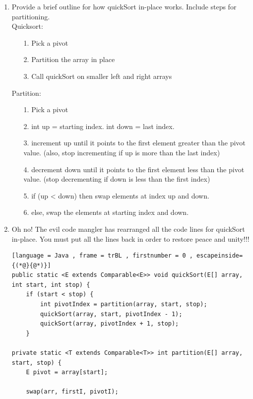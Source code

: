 \documentclass[letter]{article}
\begin{document}
\begin{enumerate}[1.]
    \item Provide a brief outline for how quickSort in-place works. Include steps for partitioning.\\

    Quicksort:
    \begin{itemize}
        \item [1.] Pick a pivot
        \item [2.] Partition the array in place
        \item [3.] Call quickSort on smaller left and right arrays
    \end{itemize}

    Partition:
    \begin{itemize}
        \item [1.] Pick a pivot
        \item [2.] int up = starting index. int down = last index.
        \item [3.] increment up until it points to the first element greater than the pivot value. (also, stop incrementing if up is more than the last index)
        \item [4.] decrement down until it points to the first element less than the pivot value. (stop decrementing if down is less than the first index)
        \item [5.] if (up < down) then swap elements at index up and down.
        \item [6.] else, swap the elements at starting index and down.
    \end{itemize}

    \newpage

    \item Oh no! The evil code mangler has rearranged all the code lines for quickSort in-place. You must put all the lines back in order to restore peace and unity!!!\\

    \begin{lstlisting}[language = Java , frame = trBL , firstnumber = 0 , escapeinside={(*@}{@*)}]
public static <E extends Comparable<E>> void quickSort(E[] array, int start, int stop) {
    if (start < stop) {
        int pivotIndex = partition(array, start, stop);
        quickSort(array, start, pivotIndex - 1);
        quickSort(array, pivotIndex + 1, stop);
    }

private static <T extends Comparable<T>> int partition(E[] array, start, stop) {
    E pivot = array[start];

    swap(arr, firstI, pivotI);


\end{lstlisting}
\end{enumerate}
\end{document}
